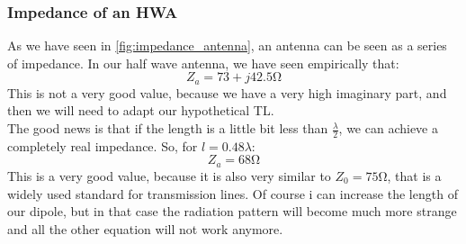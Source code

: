\subsubsection*{Impedance of an HWA}
As we have seen in \cref{fig:impedance_antenna}, an antenna can be seen as a series of impedance. In our half wave antenna, we have seen empirically that:
\begin{equation}
    Z_a=73+j42.5 \si{\ohm}
\end{equation}
This is not a very good value, because we have a very high imaginary part, and then we will need to adapt our hypothetical TL.\\
The good news is that if the length is a little bit less than $\frac{\lambda}{2}$, we can achieve a completely real impedance. So, for $l=0.48\lambda$:
\begin{equation}
    Z_a=68\si{\ohm}
\end{equation}
This is a very good value, because it is also very similar to $Z_0=75\si{\ohm}$, that is a widely used standard for transmission lines.
Of course i can increase the length of our dipole, but in that case the radiation pattern will become much more strange and all the other equation will not work anymore.
